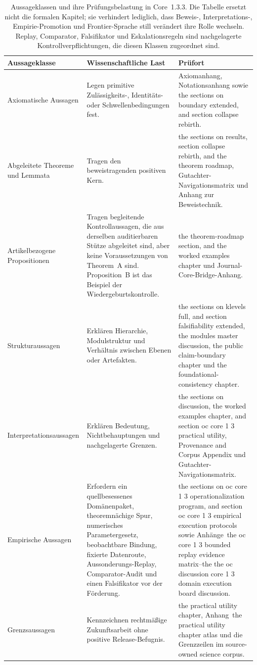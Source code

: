 \begin{table}[htbp]
\centering
\begingroup
\footnotesize
\RaggedRight
\setlength{\tabcolsep}{4pt}
\begin{tabular}{@{}L{0.21\textwidth}L{0.28\textwidth}L{0.39\textwidth}@{}}
\toprule
\textbf{Aussageklasse} & \textbf{Wissenschaftliche Last} & \textbf{Prüfort} \\
\midrule
Axiomatische Aussagen & Legen primitive Zulässigkeits-, Identitäts- oder Schwellenbedingungen fest. & Axiomanhang, Notationsanhang sowie the sections on boundary extended, and section collapse rebirth. \\
Abgeleitete Theoreme und Lemmata & Tragen den beweistragenden positiven Kern. & the sections on results, section collapse rebirth, and the theorem roadmap, Gutachter-Navigationsmatrix und Anhang zur Beweistechnik. \\
Artikelbezogene Propositionen & Tragen begleitende Kontrollaussagen, die aus derselben auditierbaren Stütze abgeleitet sind,
      aber keine Voraussetzungen von Theorem~A sind. Proposition~B ist das Beispiel der Wiedergeburtskontrolle. & the theorem-roadmap section, and the worked examples chapter und Journal-Core-Bridge-Anhang. \\
Strukturaussagen & Erklären Hierarchie, Modulstruktur und Verhältnis zwischen Ebenen oder Artefakten. & the sections on klevels full, and section falsifiability extended, the modules master discussion, the public claim-boundary chapter und the foundational-consistency chapter. \\
Interpretationsaussagen & Erklären Bedeutung, Nichtbehauptungen und nachgelagerte Grenzen. & the sections on discussion, the worked examples chapter, and section oc core 1 3 practical utility, Provenance and Corpus Appendix und Gutachter-Navigationsmatrix. \\
Empirische Aussagen & Erfordern ein quellbesessenes Domänenpaket, theoremnächige Spur, numerisches
      Parametergesetz, beobachtbare Bindung, fixierte Datenroute, Aussonderungs-Replay,
      Comparator-Audit und einen Falsifikator vor der Förderung. & the sections on oc core 1 3 operationalization program, and section oc core 1 3 empirical execution protocols sowie Anhänge~the oc core 1 3 bounded replay evidence matrix--the the oc discussion core 1 3 domain execution board discussion. \\
Grenzsaussagen & Kennzeichnen rechtmäßige Zukunftsarbeit ohne positive Release-Befugnis. & the practical utility chapter, Anhang~the practical utility chapter atlas und die Grenzzeilen im source-owned science corpus. \\
\bottomrule
\end{tabular}
\endgroup
\caption{Aussageklassen und ihre Prüfungsbelastung in Core~1.3.3. Die Tabelle ersetzt nicht die formalen Kapitel;
sie verhindert lediglich, dass Beweis-, Interpretations-, Empirie-Promotion und Frontier-Sprache still
verändert ihre Rolle wechseln. Replay, Comparator, Falsifikator und Eskalationsregeln sind nachgelagerte
Kontrollverpflichtungen, die diesen Klassen zugeordnet sind.}
\label{tab:oc13-statement-classes}
\end{table}

